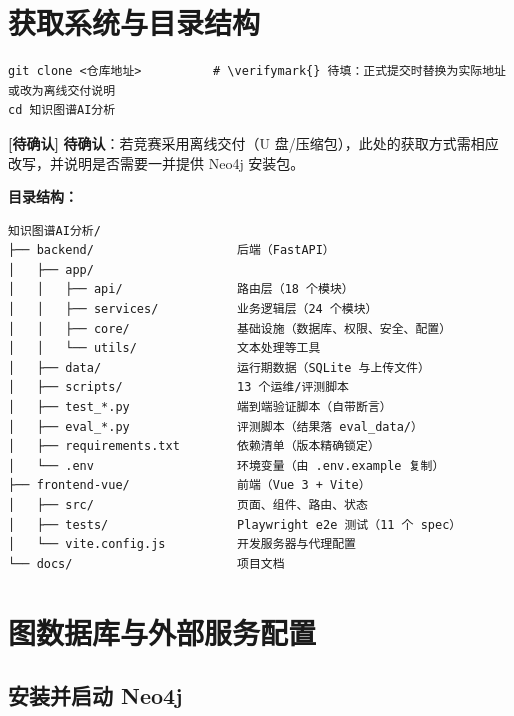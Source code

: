 \documentclass[UTF8,a4paper,11pt]{ctexrep}
\newcommand{\verifymark}{\textcolor{todobar}{\textbf{[待确认]}}}
\begin{document}
\section{获取系统与目录结构}

\begin{Verbatim}[breaklines=true,breakanywhere=true,fontsize=\small,frame=single,framesep=4pt,rulecolor=\color{codeframe}]
git clone <仓库地址>          # \verifymark{} 待填：正式提交时替换为实际地址或改为离线交付说明
cd 知识图谱AI分析
\end{Verbatim}

\begin{todobox}
\verifymark{} \textbf{待确认}：若竞赛采用离线交付（U 盘/压缩包），此处的获取方式需相应改写，并说明是否需要一并提供 Neo4j 安装包。

\end{todobox}

\textbf{目录结构：}

\begin{Verbatim}[fontsize=\small,frame=single,framesep=4pt,rulecolor=\color{codeframe}]
知识图谱AI分析/
├── backend/                    后端（FastAPI）
│   ├── app/
│   │   ├── api/                路由层（18 个模块）
│   │   ├── services/           业务逻辑层（24 个模块）
│   │   ├── core/               基础设施（数据库、权限、安全、配置）
│   │   └── utils/              文本处理等工具
│   ├── data/                   运行期数据（SQLite 与上传文件）
│   ├── scripts/                13 个运维/评测脚本
│   ├── test_*.py               端到端验证脚本（自带断言）
│   ├── eval_*.py               评测脚本（结果落 eval_data/）
│   ├── requirements.txt        依赖清单（版本精确锁定）
│   └── .env                    环境变量（由 .env.example 复制）
├── frontend-vue/               前端（Vue 3 + Vite）
│   ├── src/                    页面、组件、路由、状态
│   ├── tests/                  Playwright e2e 测试（11 个 spec）
│   └── vite.config.js          开发服务器与代理配置
└── docs/                       项目文档
\end{Verbatim}


\section{图数据库与外部服务配置}


\subsection{安装并启动 Neo4j}
\end{document}
